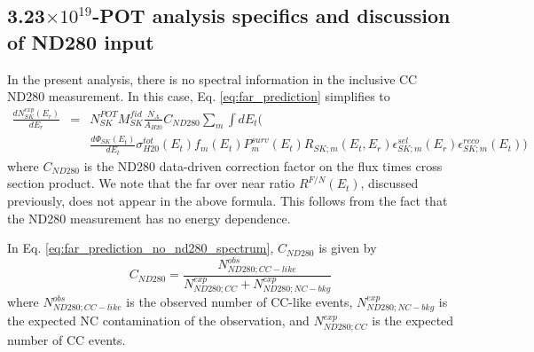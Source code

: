 \subsection {3.23$\times10^{19}$-POT analysis specifics and discussion of ND280 input}
\label{sec:superkprediction_analysis_specifics}

In the present analysis, there is no spectral information in the inclusive CC ND280 measurement.
In this case, Eq. \ref{eq:far_prediction} simplifies to
\begin{equation}
\displaystyle
\begin{array}{lcl}
  \frac{dN_{SK}^{exp}(E_{r})}{dE_{r}}  & = & 
    N_{SK}^{POT} M_{SK}^{fid} \frac{N_{A}}{A_{H20}}
    C_{ND280}
    {\displaystyle \sum_{m} \int dE_{t}} \Bigg( 
    \\ & &
    \frac{d\Phi_{SK}(E_{t})}{dE_{t}} 
    \sigma_{H20}^{tot}(E_{t}) 
    f_{m}(E_{t}) 
    P_{m}^{surv}(E_{t}) 
    R_{SK;m}(E_{t},E_{r}) 
    \epsilon^{sel}_{SK;m}(E_{r}) 
    \epsilon^{reco}_{SK;m}(E_{t}) \Bigg)
\end{array}
\label{eq:far_prediction_no_nd280_spectrum}
\end{equation}
where $C_{ND280}$ is the ND280 data-driven correction factor on the flux times cross section product.
We note that the far over near ratio $R^{F/N}(E_{t})$, discussed previously, does not appear in the above formula.
This follows from the fact that the ND280 measurement has no energy dependence.

In Eq. \ref{eq:far_prediction_no_nd280_spectrum}, $C_{ND280}$ is given by
\begin{equation}
\displaystyle
  C_{ND280} = 
    \frac{N^{obs}_{ND280;CC-like}}
         {N^{exp}_{ND280;CC}+N^{exp}_{ND280;NC-bkg}}
\label{eq:nd280correction}
\end{equation}
where
$N^{obs}_{ND280;CC-like}$ is the observed number of CC-like events,
$N^{exp}_{ND280;NC-bkg}$ is the expected NC contamination of the observation, and
$N^{exp}_{ND280;CC}$ is the expected number of CC events.

